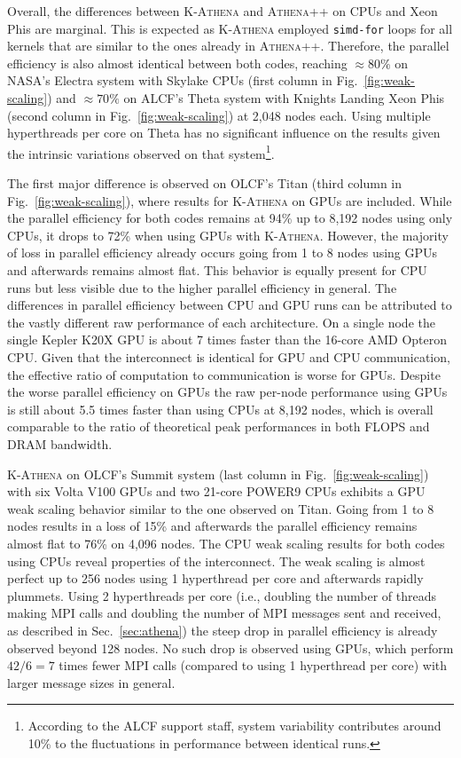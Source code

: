 \documentclass[10pt,journal,compsoc]{IEEEtran}
\newcommand{\textcode}[1]{\textsc{#1}}
\newcommand{\athena}{\textcode{Athena++}\xspace}
\newcommand{\kathena}{\textcode{K-Athena}\xspace}
\newcommand{\mpi}{\textcode{MPI}\xspace}
\begin{document}
Overall, the differences between \kathena and \athena on CPUs and Xeon Phis are marginal.
This is expected as \kathena employed \texttt{simd-for} loops for all
kernels that are  
similar to the ones already in \athena.
Therefore, the parallel efficiency is also almost identical between both codes, reaching
$\approx80\%$ on NASA's Electra system with Skylake CPUs 
(first column in Fig.~\ref{fig:weak-scaling})
and $\approx70\%$ on  ALCF's Theta system with Knights Landing Xeon Phis 
(second column in Fig.~\ref{fig:weak-scaling})
at 2,048 nodes each.
Using multiple hyperthreads per core on Theta has no significant influence on the results 
given the intrinsic variations observed on that system\footnote{According to the ALCF
support staff, system variability contributes around 10\% to the
fluctuations in performance between identical
runs.}.

The first major difference is observed on OLCF's Titan 
(third column in Fig.~\ref{fig:weak-scaling}),
where results for \kathena on GPUs are included.
While the parallel efficiency for both codes remains at 94\% up to 8,192 
nodes using only CPUs, it drops to 72\% when using GPUs with \kathena.
However, the majority of loss in parallel efficiency already occurs going from 1 to 8 nodes
using GPUs and afterwards remains almost flat.
This behavior is equally present for CPU runs but less visible due to the higher
parallel efficiency in general.
The differences in parallel efficiency between CPU and GPU runs can be attributed to the
vastly different raw performance of each architecture.
On a single node the single Kepler K20X GPU is about 7 times faster than
the 16-core AMD Opteron CPU.
Given that the interconnect is identical for GPU and CPU communication, the effective ratio
of computation to communication is worse for GPUs.
Despite the worse parallel efficiency on GPUs the raw per-node performance using GPUs
is still about 5.5 times faster than using CPUs at 8,192 nodes,
which is overall comparable to the ratio of theoretical peak performances in both
FLOPS and DRAM bandwidth.

\kathena on 
OLCF's Summit system (last column in Fig.~\ref{fig:weak-scaling}) with six Volta V100 GPUs
and two 21-core POWER9 CPUs exhibits a GPU weak scaling behavior similar to the one observed
on Titan.
Going from 1 to 8 nodes results in a loss of 15\% and afterwards the parallel
efficiency remains almost flat to 76\% on 4,096 nodes.
The CPU weak scaling results for both codes using CPUs reveal properties of the 
interconnect.
The weak scaling is almost perfect up to 256 nodes using 1 hyperthread per core 
and afterwards rapidly plummets.
Using 2 hyperthreads per core (i.e., doubling the number of threads making \mpi calls and 
doubling the number of \mpi messages sent and received, as described in 
Sec.~\ref{sec:athena})
the steep drop in parallel efficiency is already observed 
beyond 128 nodes.
No such drop is observed using GPUs, which perform $42/6 = 7$ times fewer \mpi calls 
(compared to using 1 hyperthread per core) with larger message sizes in general.
\end{document}
